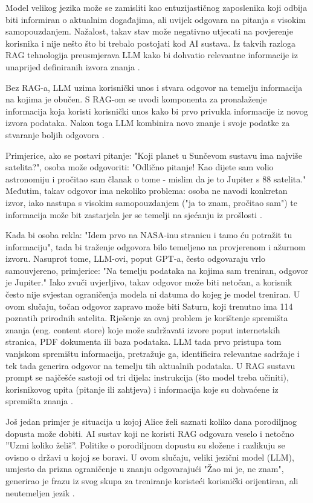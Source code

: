 \documentclass[]{foi}
\begin{document}
Model velikog jezika može se zamisliti kao entuzijastičnog zaposlenika koji odbija biti informiran o aktualnim događajima, ali uvijek odgovara
na pitanja s visokim samopouzdanjem. Nažalost, takav stav može negativno utjecati na povjerenje korisnika i nije nešto što bi trebalo postojati
kod AI sustava. Iz takvih razloga RAG tehnologija preusmjerava LLM kako bi dohvatio relevantne informacije iz unaprijed definiranih izvora znanja \cite{awsRAG2025}.

Bez RAG-a, LLM uzima korisnički unos i stvara odgovor na temelju informacija na kojima je obučen. S RAG-om se uvodi komponenta za pronalaženje 
informacija koja koristi korisnički unos kako bi prvo privukla informacije iz novog izvora podataka. Nakon toga LLM kombinira novo znanje i svoje 
podatke za stvaranje boljih odgovora \cite{awsRAG2025}.

Primjerice, ako se postavi pitanje: "Koji planet u Sunčevom sustavu ima najviše satelita?", osoba može odgovoriti: "Odlično pitanje! Kao dijete sam volio astronomiju i pročitao sam članak o tome
- mislim da je to Jupiter s 88 satelita." Međutim, takav odgovor ima nekoliko problema: osoba ne navodi konkretan izvor, iako nastupa s visokim samopouzdanjem ("ja to znam, pročitao sam")
te informacija može bit zastarjela jer se temelji na sjećanju iz prošlosti \cite{ibm2023rag}.

Kada bi osoba rekla: "Idem prvo na NASA-inu stranicu i tamo ću potražit tu informaciju", tada bi traženje odgovora bilo temeljeno na provjerenom i ažurnom izvoru.
Nasuprot tome, LLM-ovi, poput GPT-a, često odgovaraju vrlo samouvjereno, primjerice: "Na temelju podataka na kojima sam treniran, odgovor je Jupiter."
Iako zvuči uvjerljivo, takav odgovor može biti netočan, a korisnik često nije svjestan ograničenja modela ni datuma do kojeg je model treniran. U ovom slučaju, točan odgovor 
zapravo može biti Saturn, koji trenutno ima 114 poznatih prirodnih satelita. Rješenje za ovaj problem je korištenje spremišta znanja (eng. content store) koje može sadržavati izvore poput
internetskih stranica, PDF dokumenta ili baza podataka. LLM tada prvo pristupa tom vanjskom spremištu informacija, pretražuje ga, identificira relevantne sadržaje i tek tada generira
odgovor na temelju tih aktualnih podataka. U RAG sustavu prompt se najčešće sastoji od tri dijela: instrukcija (što model treba učiniti), korisnikovog upita (pitanje ili zahtjeva) i informacija 
koje su dohvaćene iz spremišta znanja \cite{ibm2023rag}.

Još jedan primjer je situacija u kojoj Alice želi saznati koliko dana porodiljnog dopusta može dobiti. AI sustav koji ne koristi RAG odgovara veselo i netočno ”Uzmi koliko želiš”.
Politike o porodiljnom dopustu su složene i razlikuju se ovisno o državi u kojoj se boravi. U ovom slučaju, veliki jezični model (LLM), umjesto da prizna ograničenje u znanju odgovarajući
"Žao mi je, ne znam", generirao je frazu iz svog skupa za treniranje koristeći korisnički orijentiran, ali neutemeljen jezik \cite{ibmRAG}.
\end{document}
